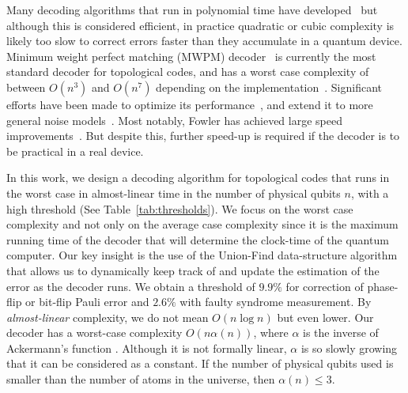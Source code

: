 \documentclass[a4paper, 10pt, accepted=2021-11-03]{quantumarticle}
\begin{document}
\medskip
Many decoding algorithms that run in polynomial time have developed~\cite{
dennis2002topological,
harrington2004:phd,
dennis2005:phd,
raussenfort2007:ft,
stace2010error,
barrett2010fault,
duclos2010fast,
fowler2012topological,
fowler2012:decoding,
wootton2012high,
duclos2013fault,
duclos2013kitaev,
bravyi2013quantum,
hutter2014:HDRG,
anwar2014fast,
bravyi2014efficient,
hutter2015:improved_HDRG,
wootton2015:simple_decoder,
fowler2015:parallel_MWPM,
watson2015fast,
varsamopoulos2017decoding,
herold2015fault,
torlai2017neural,
tuckett2017ultra,
landahl2011:color_codes_decoding,
wang2009graphical,
sarvepalli2012efficient,
bombin2012:color_codes_decoder,
delfosse2014decoding, 
kubica2018:phd}
but although this is considered efficient, in practice quadratic or cubic complexity
is likely too slow to correct errors faster than they accumulate in a quantum device. 
Minimum weight perfect matching (MWPM) decoder~\cite{dennis2002topological}
is currently the most standard decoder for topological codes, and has a worst case 
complexity of between $O(n^3)$ and $O(n^7)$ depending on the implementation~\cite{kolmogorov2009:blossom}. 
Significant efforts have been made to optimize its performance~\cite{fowler2012topological}, and extend it to more general noise models~\cite{stace2010:loss_long, barrett2010:loss, stace2010:percolation, whiteside2014:loss}. Most notably, Fowler
has achieved large speed improvements~\cite{fowler2015:parallel_MWPM}.
But despite this, further speed-up is required if the decoder is to be practical in a real device. 

\medskip
In this work, we design a decoding algorithm for topological codes 
that runs in the worst case in almost-linear time in the number of physical qubits $n$,
with a high threshold (See Table~\ref{tab:thresholds}).
We focus on the worst case complexity and not only on the average case complexity 
since it is the maximum running time of the decoder that will determine the clock-time 
of the quantum computer.
Our key insight is the use of the Union-Find data-structure 
algorithm~\cite{galler1964:union_find_algorithm, tarjan1975:union_find_complexity} 
that allows us to dynamically keep track of and update the estimation of the error as the decoder runs. 
We obtain a threshold of $9.9\%$ for correction of phase-flip or bit-flip Pauli error 
and $2.6\%$ with faulty syndrome measurement. 
By {\em almost-linear} complexity, we do not mean $O(n \log n)$ but even lower.
Our decoder has a worst-case complexity $O(n \alpha(n))$, where 
$\alpha$ is the inverse of Ackermann's function \cite{tarjan1975:union_find_complexity}. 
Although it is not formally linear, $\alpha$ is so slowly growing that it can be considered 
as a constant. 
If the number of physical qubits used is smaller than the number of atoms in the universe, 
then $\alpha(n) \leq 3$. 
\end{document}
